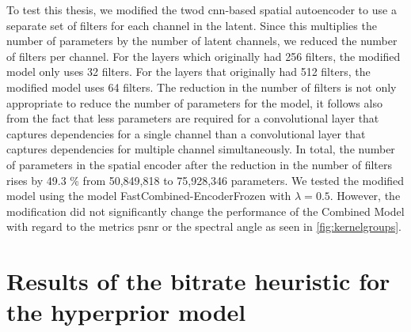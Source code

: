 To test this thesis, we modified the \ac{twod} \ac{cnn}-based spatial autoencoder to use a separate set of filters for each channel in the latent. Since this multiplies the number of parameters by the number of latent channels, we reduced the number of filters per channel. For the layers which originally had 256 filters, the modified model only uses 32 filters. For the layers that originally had 512 filters, the modified model uses 64 filters. The reduction in the number of filters is not only appropriate to reduce the number of parameters for the model, it follows also from the fact that less parameters are required for a convolutional layer that captures dependencies for a single channel than a convolutional layer that captures dependencies for multiple channel simultaneously. In total, the number of parameters in the spatial encoder after the reduction in the number of filters rises by 49.3 \% from 50,849,818 to 75,928,346 parameters. We tested the modified model using the model FastCombined-EncoderFrozen with $\lambda=0.5$. However, the modification did not significantly change the performance of the Combined Model with regard to the metrics \ac{psnr} or the spectral angle as seen in \autoref{fig:kernelgroups}. 

\section{Results of the bitrate heuristic for the hyperprior model\label{sec:ch5heur}}



